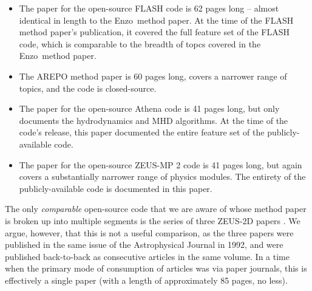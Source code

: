 \documentclass[11pt]{article}
\newcommand{\code}[1]{\textsf{#1}}
\newcommand{\enzo}{\code{Enzo}}
\begin{document}
\begin{itemize}
\item The paper for the open-source FLASH code
\citep{2000ApJS..131..273F} is 62 pages long -- almost identical in
length to the \enzo\ method paper.  At the time of the FLASH method paper's
publication, it covered the full feature set of the FLASH code, which
is comparable to the breadth of topcs covered in the \enzo\ method
paper.

\item The AREPO method paper \citep{2010MNRAS.401..791S} is 60 pages
long, covers a narrower range of topics, and the code is
closed-source.

\item The paper for the open-source Athena code
\citep{2008ApJS..178..137S} is 41 pages long, but only documents the
hydrodynamics and MHD algorithms.  At the time of the code's release,
this paper documented the entire feature set of the publicly-available
code.

\item The paper for the open-source ZEUS-MP 2 code
\citep{2006ApJS..165..188H} is 41 pages long, but again covers a
substantially narrower range of physics modules.  The entirety of the
publicly-available code is documented in this paper.
\end{itemize}

The only \textit{comparable} open-source code that we are aware of
whose method paper is broken up into multiple segments is the series
of three ZEUS-2D papers \citep{1992ApJS...80..753S,
1992ApJS...80..791S, 1992ApJS...80..819S}.  We argue, however, that
this is not a useful comparison, as the three papers were published in
the same issue of the Astrophysical Journal in 1992, and were
published back-to-back as consecutive articles in the same volume.  In
a time when the primary mode of consumption of articles was via paper
journals, this is effectively a single paper (with a length of
approximately 85 pages, no less).
\end{document}
